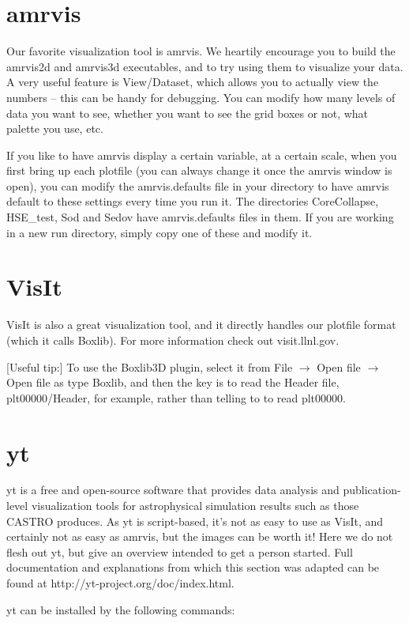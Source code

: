 \section{amrvis}
Our favorite visualization tool is amrvis. We heartily encourage you
to build the amrvis2d and amrvis3d executables, and to try using them
to visualize your data. A very useful feature is View/Dataset, which
allows you to actually view the numbers -- this can be handy for
debugging. You can modify how many levels of data you want to see,
whether you want to see the grid boxes or not, what palette you use,
etc.

If you like to have amrvis display a certain variable, at a certain
scale, when you first bring up each plotfile (you can always change it
once the amrvis window is open), you can modify the amrvis.defaults
file in your directory to have amrvis default to these settings every
time you run it. The directories CoreCollapse, HSE\_test, Sod and
Sedov have amrvis.defaults files in them. If you are working in a new
run directory, simply copy one of these and modify it.


\section{VisIt}
VisIt is also a great visualization tool, and it directly handles our
plotfile format (which it calls Boxlib).  For more information check
out visit.llnl.gov.

[Useful tip:] To use the Boxlib3D plugin, select it from File
$\rightarrow$ Open file $\rightarrow$ Open file as type Boxlib, and
then the key is to read the Header file, plt00000/Header, for example,
rather than telling to to read plt00000.

\section{yt}
yt is a free and open-source software that provides data analysis and
publication-level visualization tools for astrophysical simulation
results such as those CASTRO produces. As yt is script-based, it's not
as easy to use as VisIt, and certainly not as easy as amrvis, but the
images can be worth it! Here we do not flesh out yt, but give an
overview intended to get a person started. Full documentation and
explanations from which this section was adapted can be found at
http://yt-project.org/doc/index.html.

yt can be installed by the following commands:

